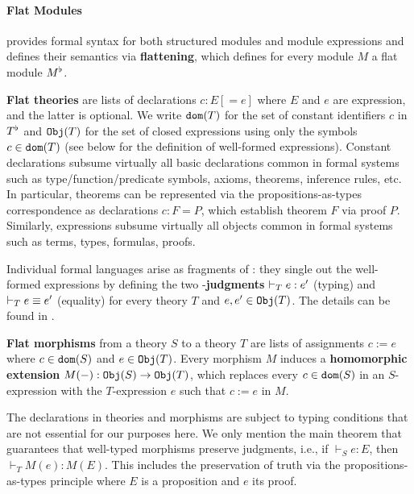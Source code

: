 \paragraph{Flat Modules}
\mmt provides formal syntax for both structured modules and module expressions and defines their semantics via \textbf{flattening}, which defines for every module $M$ a flat module $M^\flat$.

\textbf{Flat theories} are lists of declarations $c:E[=e]$ where $E$ and $e$ are expression, and the latter is optional.
We write $\mathtt{dom}(T)$ for the set of constant identifiers $c$ in $T^\flat$ and $\mathtt{Obj}(T)$ for the set of closed expressions using only the symbols $c\in\mathtt{dom}(T)$ (see below for the definition of well-formed expressions).
Constant declarations subsume virtually all basic declarations common in formal systems such as type/function/predicate symbols, axioms, theorems, inference rules, etc.
In particular, theorems can be represented via the propositions-as-types correspondence as declarations $c:F=P$, which establish theorem $F$ via proof $P$.
Similarly, \mmt expressions subsume virtually all objects common in formal systems such as terms, types, formulas, proofs.

Individual formal languages arise as fragments of \mmt: they single out the well-formed expressions by defining the two \mmt-\textbf{judgments} $\vdash_T e:e'$ (typing) and $\vdash_T e\equiv e'$ (equality) for every theory $T$ and $e,e'\in\mathtt{Obj}(T)$.
The details can be found in \cite{rabe:howto:14}.

\textbf{Flat morphisms} from a theory $S$ to a theory $T$ are lists of assignments $c:=e$ where $c\in\mathtt{dom}(S)$ and $e\in\mathtt{Obj}(T)$.
Every morphism $M$ induces a \textbf{homomorphic extension} $M(-):\mathtt{Obj}(S)\to\mathtt{Obj}(T)$, which replaces every $c\in\mathtt{dom}(S)$ in an $S$-expression with the $T$-expression $e$ such that $c:=e$ in $M$.

The declarations in theories and morphisms are subject to typing conditions that are not essential for our purposes here.
We only mention the main theorem that guarantees that well-typed morphisms preserve judgments, i.e., if $\vdash_S e:E$, then $\vdash_T M(e):M(E)$.
This includes the preservation of truth via the propositions-as-types principle where $E$ is a proposition and $e$ its proof.

